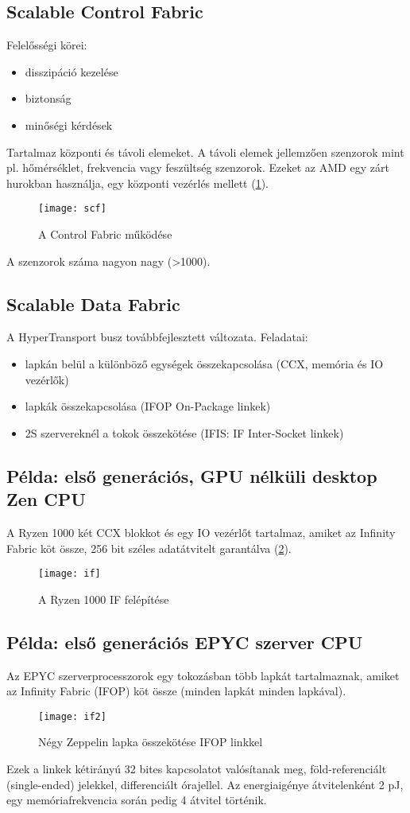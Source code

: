 \subsection{Scalable Control Fabric}
Felelősségi körei:
\begin{itemize}
    \item disszipáció kezelése
    \item biztonság
    \item minőségi kérdések
\end{itemize}
Tartalmaz központi és távoli elemeket.
A távoli elemek jellemzően szenzorok mint pl. hőmérséklet, frekvencia vagy feszültség szenzorok.
Ezeket az AMD egy zárt hurokban használja, egy központi vezérlés mellett (\ref{fig:scf}).
\begin{figure}[H]
    \texttt{[image: scf]}
    \centering
    \caption{A Control Fabric működése}
    \label{fig:scf}
\end{figure}
A szenzorok száma nagyon nagy (>1000).

\subsection{Scalable Data Fabric}
A HyperTransport busz továbbfejlesztett változata.
Feladatai:
\begin{itemize}
    \item lapkán belül a különböző egységek összekapcsolása (CCX, memória és IO vezérlők)
    \item lapkák összekapcsolása (IFOP On-Package linkek)
    \item 2S szervereknél a tokok összekötése (IFIS: IF Inter-Socket linkek)
\end{itemize}

\subsection{Példa: első generációs, GPU nélküli desktop Zen CPU}
A Ryzen 1000 két CCX blokkot és egy IO vezérlőt tartalmaz, amiket az Infinity Fabric köt össze, 256 bit széles adatátvitelt garantálva (\ref{fig:if}).
\begin{figure}[H]
    \texttt{[image: if]}
    \centering
    \caption{A Ryzen 1000 IF felépítése}
    \label{fig:if}
\end{figure}

\subsection{Példa: első generációs EPYC szerver CPU}
Az EPYC szerverprocesszorok egy tokozásban több lapkát tartalmaznak, amiket az Infinity Fabric (IFOP) köt össze (minden lapkát minden lapkával).
\begin{figure}[H]
    \texttt{[image: if2]}
    \centering
    \caption{Négy Zeppelin lapka összekötése IFOP linkkel}
    \label{fig:if2}
\end{figure}
Ezek a linkek kétirányú 32 bites kapcsolatot valósítanak meg, föld-referenciált (single-ended) jelekkel, differenciált órajellel.
Az energiaigénye átvitelenként 2 pJ, egy memóriafrekvencia során pedig 4 átvitel történik.

